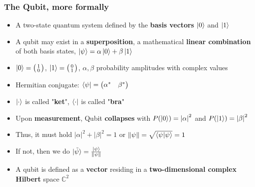\documentclass{beamer}
\begin{document}
\begin{frame}
	\frametitle{The Qubit, more formally}
	\begin{itemize}
		\item A two-state quantum system defined by the \textbf{basis vectors} $\ket{0}$ and $\ket{1}$
		\item A qubit may exist in a \textbf{superposition}, a mathematical \textbf{linear combination} of both basis states, $\ket{\psi} = \alpha \ket{0} + \beta \ket{1}$
		\item $\ket{0} = \bigl( \begin{smallmatrix} 1 \\ 0 \end{smallmatrix} \bigr)$, $\ket{1} = \bigl( \begin{smallmatrix} 0 \\ 1 \end{smallmatrix} \bigr)$, $\alpha, \beta$  probability amplitudes with complex values
		\item Hermitian conjugate: $\bra{\psi} = \begin{pmatrix} \alpha^* & \beta^* \end{pmatrix}$
		\item $\ket{\cdot}$ is called "\textbf{ket}", $\bra{\cdot}$ is called "\textbf{bra}"
		\item Upon \textbf{measurement}, Qubit \textbf{collapses} with $P(\ket{0} )= \left|\alpha\right|^2$ and $P(\ket{1} )= \left|\beta\right|^2$
		\item Thus, it must hold $\left|\alpha\right|^2 + \left|\beta\right|^2 = 1$ or $\left\| \psi \right\|= \sqrt{\braket{\psi|\psi}} = 1$
		\item If not, then we do $\ket{\tilde{\psi}} = \frac{\ket{\psi}}{\left\| \psi \right\|}$
		\item A qubit is defined as a \textbf{vector} residing in a \textbf{two-dimensional complex Hilbert} space $\mathbb{C}^2$
	\end{itemize}
	
\end{frame}
\end{document}
